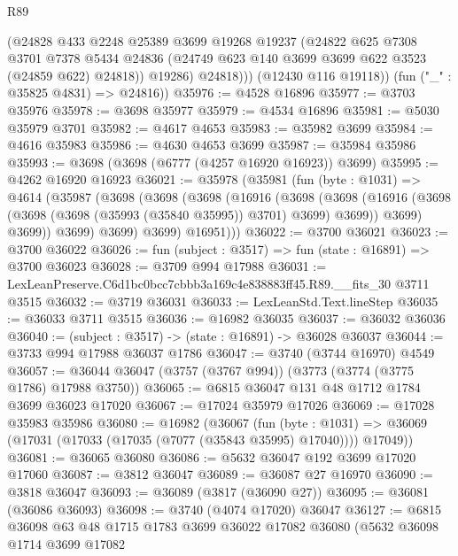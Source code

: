 \begin{lexlean}{R89}
\begin{coremodule}
              (@24828
                @433
                @2248
                @25389
                @3699
                @19268
                @19237
                (@24822
                  @625
                  @7308
                  @3701
                  @7378
                  @5434
                  @24836
                  (@24749 @623 @140 @3699 @3699 @622 @3523 (@24859 @622) @24818))
                @19286)
              @24818)))
        (@12430 @116 @19118))
      (fun ("_" : @35825 @4831) => @24816))
@35976 := @4528 @16896
@35977 := @3703 @35976
@35978 := @3698 @35977
@35979 := @4534 @16896
@35981 := @5030 @35979 @3701
@35982 := @4617 @4653
@35983 := @35982 @3699
@35984 := @4616 @35983
@35986 := @4630 @4653 @3699
@35987 := @35984 @35986
@35993 := @3698 (@3698 (@6777 (@4257 @16920 @16923)) @3699)
@35995 := @4262 @16920 @16923
@36021 := @35978
    (@35981
      (fun (byte : @1031) =>
      @4614
        (@35987
          (@3698
            (@3698
              (@3698
                (@16916
                  (@3698
                    (@3698
                      (@16916 (@3698 (@3698 (@3698 (@35993 (@35840 @35995)) @3701) @3699) @3699))
                      @3699)
                    @3699))
                @3699)
              @3699)
            @3699)
          @16951)))
@36022 := @3700 @36021
@36023 := @3700 @36022
@36026 := fun (subject : @3517) => fun (state : @16891) => @3700 @36023
@36028 := @3709 @994 @17988
@36031 := LexLeanPreserve.C6d1bc0bcc7cbbb3a169c4e838883ff45.R89.__fits_30 @3711 @3515
@36032 := @3719 @36031
@36033 := LexLeanStd.Text.lineStep
@36035 := @36033 @3711 @3515
@36036 := @16982 @36035
@36037 := @36032 @36036
@36040 := (subject : @3517) -> (state : @16891) -> @36028 @36037
@36044 := @3733 @994 @17988 @36037 @1786
@36047 := @3740 (@3744 @16970) @4549
@36057 := @36044 @36047 (@3757 (@3767 @994)) (@3773 (@3774 (@3775 @1786) @17988 @3750))
@36065 := @6815 @36047 @131 @48 @1712 @1784 @3699 @36023 @17020
@36067 := @17024 @35979 @17026
@36069 := @17028 @35983 @35986
@36080 := @16982
    (@36067
      (fun (byte : @1031) =>
      @36069 (@17031 (@17033 (@17035 (@7077 (@35843 @35995) @17040)))) @17049))
@36081 := @36065 @36080
@36086 := @5632 @36047 @192 @3699 @17020 @17060
@36087 := @3812 @36047
@36089 := @36087 @27 @16970
@36090 := @3818 @36047
@36093 := @36089 (@3817 (@36090 @27))
@36095 := @36081 (@36086 @36093)
@36098 := @3740 (@4074 @17020) @36047
@36127 := @6815
    @36098
    @63
    @48
    @1715
    @1783
    @3699
    @36022
    @17082
    @36080
    (@5632
      @36098
      @1714
      @3699
      @17082

\end{coremodule}
\end{lexlean}
